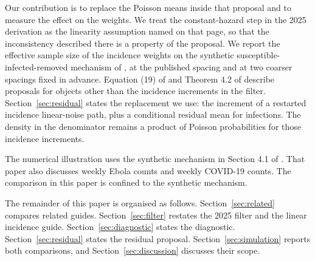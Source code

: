 Our contribution is to replace the Poisson means inside that proposal and to measure the effect on the weights. We treat the constant-hazard step in the 2025 derivation as the linearity assumption named on that page, so that the inconsistency described there is a property of the proposal. We report the effective sample size of the incidence weights on the synthetic susceptible-infected-removed mechanism of \citet{whitaker2025}, at the published spacing and at two coarser spacings fixed in advance. Equation (19) of \citet{golightly2019} and Theorem 4.2 of \citet{corstanje2023} describe proposals for objects other than the incidence increments in the filter. Section~\ref{sec:residual} states the replacement we use: the increment of a restarted incidence linear-noise path, plus a conditional residual mean for infections. The density in the denominator remains a product of Poisson probabilities for those incidence increments.

The numerical illustration uses the synthetic mechanism in Section 4.1 of \citet{whitaker2025}. That paper also discusses weekly Ebola counts and weekly COVID-19 counts. The comparison in this paper is confined to the synthetic mechanism.

The remainder of this paper is organised as follows. Section~\ref{sec:related} compares related guides. Section~\ref{sec:filter} restates the 2025 filter and the linear incidence guide. Section~\ref{sec:diagnostic} states the diagnostic. Section~\ref{sec:residual} states the residual proposal. Section~\ref{sec:simulation} reports both comparisons, and Section~\ref{sec:discussion} discusses their scope.
